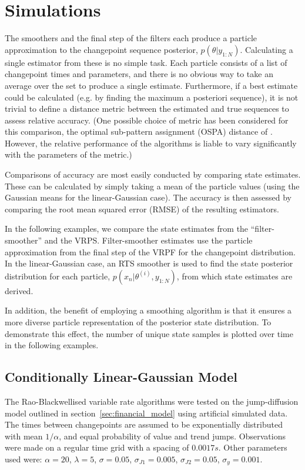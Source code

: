 \documentclass[10pt,twocolumn,twoside]{IEEEtran}
\begin{document}
\section{Simulations} \label{sec:simulations}

The smoothers and the final step of the filters each produce a particle approximation to the changepoint sequence posterior, $p(\theta|y_{1:N})$. Calculating a single estimator from these is no simple task. Each particle consists of a list of changepoint times and parameters, and there is no obvious way to take an average over the set to produce a single estimate. Furthermore, if a best estimate could be calculated (e.g. by finding the maximum a posteriori sequence), it is not trivial to define a distance metric between the estimated and true sequences to assess relative accuracy. (One possible choice of metric has been considered for this comparison, the optimal sub-pattern assignment (OSPA) distance of \cite{Schuhmacher2008}. However, the relative performance of the algorithms is liable to vary significantly with the parameters of the metric.)

Comparisons of accuracy are most easily conducted by comparing state estimates. These can be calculated by simply taking a mean of the particle values (using the Gaussian means for the linear-Gaussian case). The accuracy is then assessed by comparing the root mean squared error (RMSE) of the resulting estimators.

In the following examples, we compare the state estimates from the ``filter-smoother'' \cite{Kitagawa1996} and the VRPS. Filter-smoother estimates use the particle approximation from the final step of the VRPF for the changepoint distribution. In the linear-Gaussian case, an RTS smoother is used to find the state posterior distribution for each particle, $p(x_n|\theta^{(i)}, y_{1:N})$, from which state estimates are derived.

In addition, the benefit of employing a smoothing algorithm is that it ensures a more diverse particle representation of the posterior state distribution. To demonstrate this effect, the number of unique state samples is plotted over time in the following examples.



\subsection{Conditionally Linear-Gaussian Model} \label{sec:finance}

The Rao-Blackwellised variable rate algorithms were tested on the jump-diffusion model outlined in section~\ref{sec:financial_model} using artificial simulated data. The times between changepoints are assumed to be exponentially distributed with mean $1/\alpha$, and equal probability of value and trend jumps. Observations were made on a regular time grid with a spacing of $0.0017s$. Other parameters used were: $\alpha = 20$, $\lambda = 5$, $\sigma = 0.05$, $\sigma_{J1} = 0.005$, $\sigma_{J2} = 0.05$, $\sigma_{y} = 0.001$.
\end{document}
